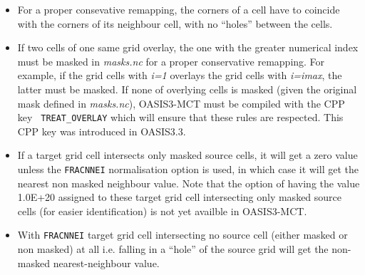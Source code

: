 \begin{itemize}
\begin{itemize}
  \item For a proper consevative remapping, the corners of a cell have
    to coincide with the corners of its neighbour cell, with no
    ``holes'' between the cells.
  
  \item If two cells of one same grid overlay, the one with
    the greater numerical index must be masked in {\it
      masks.nc} for a proper conservative remapping.  For example, 
     if the grid cells with {\it i=1} overlays the grid cells with {\it i=imax}, the latter must
    be masked.  If none of overlying cells is masked (given the
    original mask defined in {\it
      masks.nc}), OASIS3-MCT must be compiled with the CPP key {\tt
      TREAT\_OVERLAY} which will ensure that these rules are
    respected. This CPP key was introduced in OASIS3.3.
    
  \item If a target grid cell intersects only masked source cells, it
    will get a zero value unless the {\tt FRACNNEI}
    normalisation option is used, in which case it will get the
    nearest non masked neighbour value. Note that the option of
      having the value 1.0E+20 assigned to these target grid cell
      intersecting only masked source cells (for easier
      identification) is not yet availble in OASIS3-MCT.
      
 \item With {\tt FRACNNEI} target grid cell intersecting no source cell (either masked
    or non masked) at all i.e. falling in a ``hole'' of the source
    grid will get the non-masked nearest-neighbour value.   

    
   
  \end{itemize}


\end{itemize}
